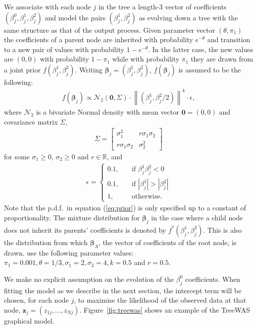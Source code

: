\documentclass[10pt]{article}
\newcommand{\B}{\symbf{\beta}}
\begin{document}
We associate with each node $j$ in the tree a length-3 vector of coefficients $(\beta^0_j,\beta^1_j,\beta^2_j)$ and model the pairs $(\beta_j^1, \beta_j^2)$ as evolving down a tree with the same structure as that of the output process. Given parameter vector $(\theta,\pi_1)$ the coefficients of a parent node are inherited with probability $e^{-\theta}$ and transition to a new pair of values with probability $1-e^{-\theta}$. In the latter case, the new values are $(0,0)$ with probability $1-\pi_1$ while with probability $\pi_1$ they are drawn from a joint prior $f(\beta_j^1,\beta_j^2)$. Writing $\B_j=(\beta_j^1,\beta_j^2)$, $f(\B_j)$ is assumed to be the following:
\begin{align}
  f(\B_j) \propto \mathcal{N}_2(\symbf{0},\Sigma) \cdot {\left\lVert (\beta_j^1, \beta_j^2/2) \right\rVert}^k \cdot \epsilon, \label{eq:prior}
\end{align}
where $\mathcal{N}_2$ is a bivariate Normal density with mean vector $\symbf{0}=(0,0)$ and covariance matrix $\Sigma$,
\begin{align*}
  \Sigma =
  \begin{bmatrix}
    \sigma_1^2 & r\sigma_1\sigma_2\\
    r\sigma_1\sigma_2 & \sigma_2^2
  \end{bmatrix}
\end{align*}
for some $\sigma_1\geq0$, $\sigma_2\geq0$ and $r\in\mathbb{R}$, and
\begin{align*}
  \epsilon = \left\{\begin{array}{ll}
        0.1, & \quad\text{if } \beta_j^1\beta_j^2 < 0\\
        0.1, & \quad\text{if } |\beta_j^1| > |\beta_j^2|\\
        1,   & \quad\text{otherwise.}
        \end{array}\right.
\end{align*}
Note that the p.d.f.\ in equation (\ref{eq:prior}) is only specified up to a constant of proportionality. The mixture distribution for $\B_j$ in the case where a child node does not inherit its parents' coefficients is denoted by $f^*(\beta_j^1,\beta_j^2)$. This is also the distribution from which $\B_A$, the vector of coefficients of the root node, is drawn. \cite{Cortes2017} use the following parameter values: $\pi_1=0.001, \theta=1/3, \sigma_1 = 2, \sigma_2 = 4, k=0.5$ and $r=0.5$.

We make no explicit assumption on the evolution of the $\beta_j^0$ coefficients. When fitting the model as we describe in the next section, the intercept term will be chosen, for each node $j$, to maximise the likelihood of the observed data at that node, $\symbf{z}_j=(z_{1j},\ldots,z_{Nj})$. Figure~\ref{fig:treewas} shows an example of the TreeWAS graphical model.
\end{document}
